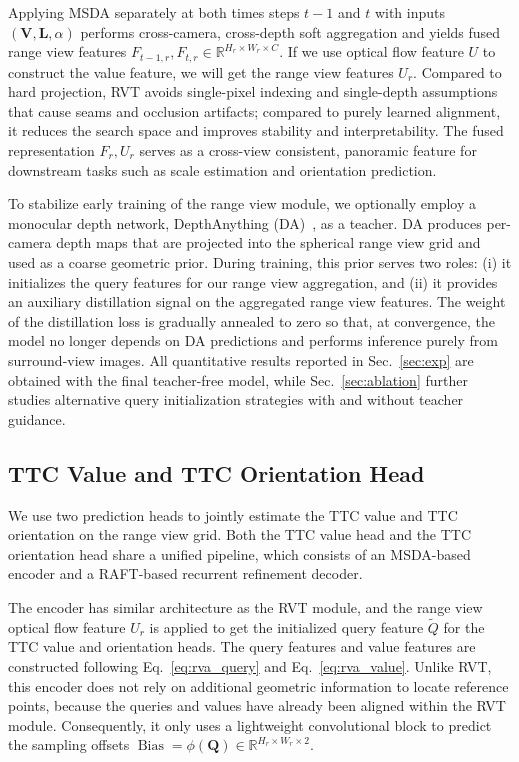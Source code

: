 \documentclass[journal]{IEEEtran}
\begin{document}
Applying MSDA separately at both times steps \(t-1\) and \(t\) with inputs  \((\mathbf{V},\mathbf{L},\alpha)\) performs cross-camera, cross-depth soft aggregation and yields fused range view features \(F_{t-1, r}, F_{t, r}  \in \mathbb{R}^{H_r \times W_r \times C}\).  If we use optical flow feature \(U\) to construct the value feature, we will get the range view features \(U_r\). Compared to hard projection, RVT avoids single-pixel indexing and single-depth assumptions that cause seams and occlusion artifacts; compared to purely learned alignment, it reduces the search space and improves stability and interpretability. The fused representation \(F_r, U_r\) serves as a cross-view consistent, panoramic feature for downstream tasks such as scale estimation and orientation prediction.

To stabilize early training of the range view module, we optionally employ a monocular depth network, DepthAnything (DA)~\cite{depth_anything_v2}, as a teacher. DA produces per-camera depth maps that are projected into the spherical range view grid and used as a coarse geometric prior. During training, this prior serves two roles: (i) it initializes the query features for our range view aggregation, and (ii) it provides an auxiliary distillation signal on the aggregated range view features. The weight of the distillation loss is gradually annealed to zero so that, at convergence, the model no longer depends on DA predictions and performs inference purely from surround-view images. All quantitative results reported in Sec.~\ref{sec:exp} are obtained with the final teacher-free model, while Sec.~\ref{sec:ablation} further studies alternative query initialization strategies with and without teacher guidance.


\subsection{TTC Value and TTC Orientation Head}
\label{sec:head}
We use two prediction heads to jointly estimate the TTC value and TTC orientation on the range view grid. Both the TTC value head and the TTC orientation head share a unified pipeline, which consists of an MSDA-based encoder and a RAFT-based recurrent refinement decoder.

The encoder has similar architecture as the RVT module, and the range view optical flow feature \(U_r\) is applied to get the initialized query feature \(\tilde{Q}\) for the TTC value and orientation heads. The query features and value features are constructed following Eq.~\ref{eq:rva_query} and Eq.~\ref{eq:rva_value}. Unlike RVT, this encoder does not rely on additional geometric information to locate reference points, because the queries and values have already been aligned within the RVT module. Consequently, it only uses a lightweight convolutional block to predict the sampling offsets \(\operatorname{Bias}=\phi(\mathbf{Q}) \in \mathbb{R}^{H_r\times W_r \times 2}\). 
\end{document}
